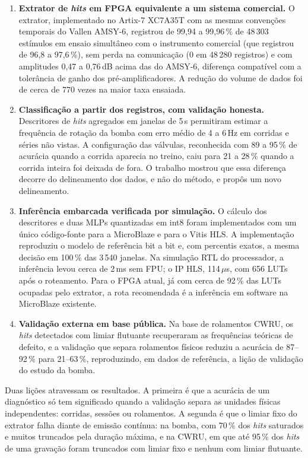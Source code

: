 \begin{enumerate}[label=\textbf{\arabic*.}]
	\item \textbf{Extrator de \textit{hits} em FPGA equivalente a um sistema comercial.} O extrator, implementado no Artix-7 XC7A35T com as mesmas convenções temporais do Vallen AMSY-6, registrou de 99,94 a 99,96\,\% de 48\,303 estímulos em ensaio simultâneo com o instrumento comercial (que registrou de 96,8 a 97,6\,\%), sem perda na comunicação (0 em 48\,280 registros) e com amplitudes 0,47 a 0,76\,dB acima das do AMSY-6, diferença compatível com a tolerância de ganho dos pré-amplificadores. A redução do volume de dados foi de cerca de 770 vezes na maior taxa ensaiada.
	\item \textbf{Classificação a partir dos registros, com validação honesta.} Descritores de \textit{hits} agregados em janelas de 5\,s permitiram estimar a frequência de rotação da bomba com erro médio de 4 a 6\,Hz em corridas e séries não vistas. A configuração das válvulas, reconhecida com 89 a 95\,\% de acurácia quando a corrida aparecia no treino, caiu para 21 a 28\,\% quando a corrida inteira foi deixada de fora. O trabalho mostrou que essa diferença decorre do delineamento dos dados, e não do método, e propôs um novo delineamento.
	\item \textbf{Inferência embarcada verificada por simulação.} O cálculo dos descritores e duas MLPs quantizadas em int8 foram implementados com um único código-fonte para a MicroBlaze e para o Vitis HLS. A implementação reproduziu o modelo de referência bit a bit e, com percentis exatos, a mesma decisão em 100\,\% das 3\,540 janelas. Na simulação RTL do processador, a inferência levou cerca de 2\,ms sem FPU; o IP HLS, 114\,\(\mu\)s, com 656 LUTs após o roteamento. Para o FPGA atual, já com cerca de 92\,\% das LUTs ocupadas pelo extrator, a rota recomendada é a inferência em software na MicroBlaze existente.
	\item \textbf{Validação externa em base pública.} Na base de rolamentos CWRU, os \textit{hits} detectados com limiar flutuante recuperaram as frequências teóricas de defeito, e a validação que separa rolamentos físicos reduziu a acurácia de 87--92\,\% para 21--63\,\%, reproduzindo, em dados de referência, a lição de validação do estudo da bomba.
\end{enumerate}

Duas lições atravessam os resultados. A primeira é que a acurácia de um diagnóstico só tem significado quando a validação separa as unidades físicas independentes: corridas, sessões ou rolamentos. A segunda é que o limiar fixo do extrator falha diante de emissão contínua: na bomba, com 70\,\% dos \textit{hits} saturados e muitos truncados pela duração máxima, e na CWRU, em que até 95\,\% dos \textit{hits} de uma gravação foram truncados com limiar fixo e nenhum com limiar flutuante.

